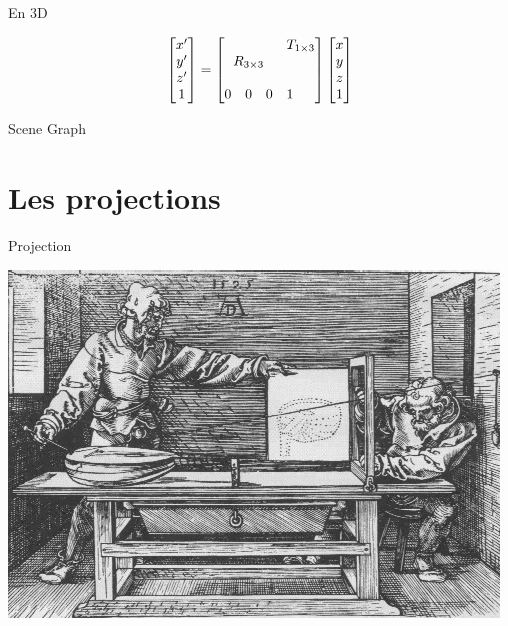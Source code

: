 \documentclass[compress]{beamer}
\def\block(#1,#2)#3{\multicolumn{#2}{c}{\multirow{#1}{*}{$ #3 $}}}
\begin{document}
\begin{frame}{En 3D}
\begin{center}
\[
\begin{bmatrix} x' \\ y' \\ z' \\ 1 \end{bmatrix} = \begin{bmatrix}
    \block(3,3){R_{3 \times 3}} & \block(1,3){T_{1 \times 3}} \\
                 &  &  &  \\
                 &  &  &  \\
                 0 & 0  & 0 & 1
\end{bmatrix} \begin{bmatrix} x \\ y \\ z \\ 1 \end{bmatrix}
\]

\end{center}
\end{frame}

\begin{frame}{Scene Graph}
    \begin{center}

    \end{center}
\end{frame}

\section[Projections]{Les projections}


\begin{frame}{Projection}
    \begin{center}
        \includegraphics[width=0.8\linewidth]{durer-projection}
    \end{center}
\end{frame}
\end{document}
